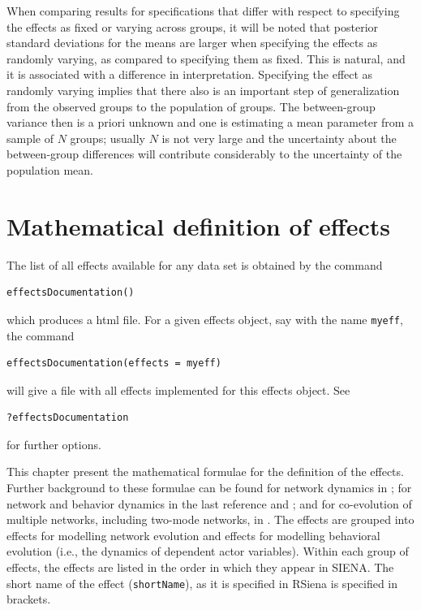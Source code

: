 \documentclass[a4paper,fleqn,11pt]{article}
\newcommand{\+}{\, + \,}
\newcommand{\RS}{{\sf \textsf{RSiena} }}
\newcommand{\si}{{\sf SIENA}}
\begin{document}
When comparing results for specifications that differ with respect
to specifying the effects as fixed or varying across groups,
it will be noted that posterior standard deviations for the means
are larger when specifying the effects as randomly varying, as compared
to specifying them as fixed. This is natural, and it is associated
with a difference in interpretation.
Specifying the effect as randomly varying implies that there also is
an important step of generalization from the observed groups to the population
of groups. The between-group variance then is a priori unknown and one is
estimating a mean parameter from a sample of $N$ groups; usually $N$ is not
very large and the uncertainty about the between-group differences
will contribute considerably to the uncertainty of the population mean.

\newpage
\section[Formulas for effects]{Mathematical definition of effects}
\label{S_math}

The list of all effects available for any data set is obtained by
the command
\begin{verbatim}
effectsDocumentation()
\end{verbatim}
which produces a html file.
For a given effects object, say with the name \texttt{myeff}, the command
\begin{verbatim}
effectsDocumentation(effects = myeff)
\end{verbatim}
will give a file with all effects implemented for this effects object.
See
\begin{verbatim}
?effectsDocumentation
\end{verbatim}
for further options.
\bigskip

This chapter present the mathematical formulae for the definition of the
effects. Further background to these formulae can be found
for network dynamics in \citet{Snijders01,Snijders05,SnijdersEA10b};
for network and behavior dynamics in the last reference and
\citet*{SteglichEA10}; and for co-evolution of multiple networks,
including two-mode networks, in \citet{SLT2013}.
The effects are grouped into effects for modelling network
evolution and effects for modelling behavioral evolution (i.e.,
the dynamics of dependent actor variables). Within each group of
effects, the effects are listed in the order in which they appear
in \si. The short name of the effect (\texttt{shortName}),
as it is specified in \RS is specified in brackets.
\end{document}
